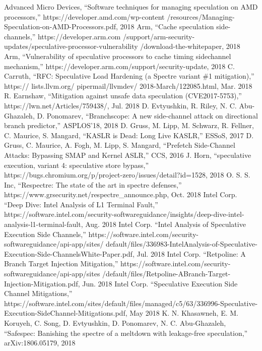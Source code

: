 \begin{thebibliography}{00}
     Advanced Micro Devices, ``Software techniques for managing speculation on AMD processors,'' https://developer.amd.com/wp-content /resources/Managing-Speculation-on-AMD-Processors.pdf, 2018
     Arm, ``Cache speculation side-channels,'' https://developer.arm.com /support/arm-security-updates/speculative-processor-vulnerability /download-the-whitepaper, 2018
     Arm, ``Vulnerability of speculative processors to cache timing sidechannel mechanism,'' https://developer.arm.com/support/security-update, 2018
     C. Carruth, ``RFC: Speculative Load Hardening (a Spectre variant \#1 mitigation),'' https:// lists.llvm.org/ pipermail/llvmdev/ 2018-March/122085.html, Mar. 2018
     R. Earnshaw, ``Mitigation against unsafe data speculation (CVE2017-5753),'' https://lwn.net/Articles/759438/, Jul. 2018
     D. Evtyushkin, R. Riley, N. C. Abu-Ghazaleh, D. Ponomarev, ``Branchscope: A new side-channel attack on directional branch predictor,'' ASPLOS’18, 2018
     D. Gruss, M. Lipp, M. Schwarz, R. Fellner, C. Maurice, S. Mangard, ``KASLR is Dead: Long Live KASLR,'' ESSoS, 2017
     D. Gruss, C. Maurice, A. Fogh, M. Lipp, S. Mangard, ``Prefetch Side-Channel Attacks: Bypassing SMAP and Kernel ASLR,'' CCS, 2016
     J. Horn, ``speculative execution, variant 4: speculative store bypass,'' https://bugs.chromium.org/p/project-zero/issues/detail?id=1528, 2018
     O. S. S. Inc, ``Respectre: The state of the art in spectre defenses,'' https://www.grsecurity.net/respectre\_announce.php, Oct. 2018
     Intel Corp. ``Deep Dive: Intel Analysis of L1 Terminal Fault,'' https://software.intel.com/security-softwareguidance/insights/deep-dive-intel-analysis-l1-terminal-fault, Aug. 2018
     Intel Corp. ``Intel Analysis of Speculative Execution Side Channels,'' https://software.intel.com/security-softwareguidance/api-app/sites/ default/files/336983-IntelAnalysis-of-Speculative-Execution-Side-ChannelsWhite-Paper.pdf, Jul. 2018
     Intel Corp. ``Retpoline: A Branch Target Injection Mitigation,'' https://software.intel.com/security-softwareguidance/api-app/sites /default/files/Retpoline-ABranch-Target-Injection-Mitigation.pdf, Jun. 2018
     Intel Corp. ``Speculative Execution Side Channel Mitigations,'' https://software.intel.com/sites/default/files/managed/c5/63/336996-Speculative-Execution-SideChannel-Mitigations.pdf, May 2018
     K. N. Khasawneh, E. M. Koruyeh, C. Song, D. Evtyushkin, D. Ponomarev, N. C. Abu-Ghazaleh, ``Safespec: Banishing the spectre of a meltdown with leakage-free speculation,'' arXiv:1806.05179, 2018

\end{thebibliography}
